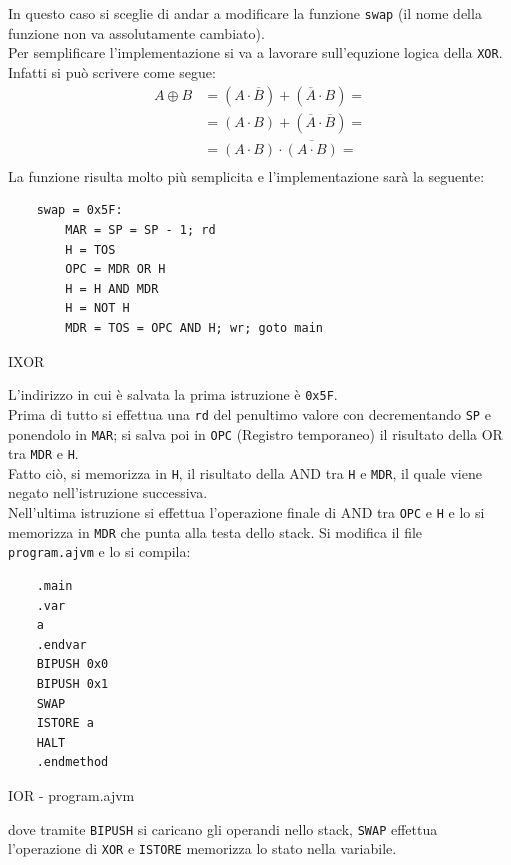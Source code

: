 In questo caso si sceglie di andar a modificare la funzione \texttt{swap} (il nome della funzione non va assolutamente cambiato).\\
Per semplificare l'implementazione si va a lavorare sull'equzione logica della \texttt{XOR}.\\
Infatti si può scrivere come segue:
\begin{equation*}
    \begin{split}
        A \oplus B &= (A \cdot \overline{B}) + (\overline{A} \cdot B) = \\
        &= (A \cdot B) + (\overline{A} \cdot \overline{B}) = \\
        &= (A \cdot B) \cdot \overline{(A \cdot B)} = \\
    \end{split}
\end{equation*}
La funzione risulta molto più semplicita e l'implementazione sarà la seguente:
\begin{listing}[H]
    \begin{verbatim}
    swap = 0x5F:
        MAR = SP = SP - 1; rd
        H = TOS
        OPC = MDR OR H 
        H = H AND MDR
        H = NOT H
        MDR = TOS = OPC AND H; wr; goto main
    \end{verbatim}
    \caption{IXOR}
\end{listing}
\noindent L'indirizzo in cui è salvata la prima istruzione è \texttt{0x5F}.\\
Prima di tutto si effettua una \texttt{rd} del penultimo valore con decrementando \texttt{SP} e ponendolo in \texttt{MAR}; si salva poi in \texttt{OPC} (Registro temporaneo) il risultato della OR tra \texttt{MDR} e \texttt{H}.\\
Fatto ciò, si memorizza in \texttt{H}, il risultato della AND tra \texttt{H} e \texttt{MDR}, il quale viene negato nell'istruzione successiva.\\
Nell'ultima istruzione si effettua l'operazione finale di AND tra \texttt{OPC} e \texttt{H} e lo si memorizza in \texttt{MDR} che punta alla testa dello stack.
Si modifica il file \texttt{program.ajvm} e lo si compila: 
\begin{listing}[H]
    \begin{verbatim}
    .main
    .var
    a
    .endvar
    BIPUSH 0x0
    BIPUSH 0x1
    SWAP
    ISTORE a
    HALT
    .endmethod
    \end{verbatim}
    \caption{IOR - program.ajvm}
\end{listing}
dove tramite \texttt{BIPUSH} si caricano gli operandi nello stack, \texttt{SWAP} effettua l'operazione di \texttt{XOR} e \texttt{ISTORE} memorizza lo stato nella variabile.

